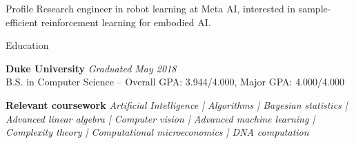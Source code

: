 \documentclass[8pt]{resume}
\begin{document}
\begin{rSection}{Profile}
  Research engineer in robot learning at Meta AI, interested in sample-efficient reinforcement learning for embodied AI.
\end{rSection}

\begin{rSection}{Education}

{\bf Duke University} \hfill {\em Graduated May 2018} \\
\/ B.S. in Computer Science -- Overall GPA: 3.944/4.000, Major GPA: 4.000/4.000

{\bf Relevant coursework}
{\it
  Artificial Intelligence | Algorithms | Bayesian statistics | Advanced linear algebra |
  Computer vision | Advanced machine learning | Complexity theory | Computational microeconomics | DNA computation
}
\end{rSection}
\end{document}
